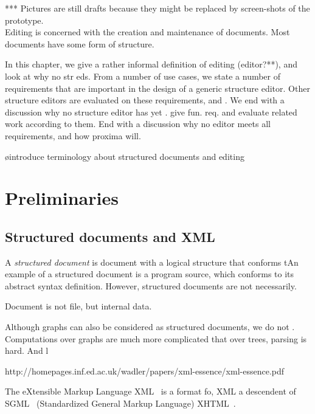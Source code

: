 *** Pictures are still drafts because they might be replaced by screen-shots of the prototype.\\

\bc
Editing is concerned with the creation and maintenance of documents.  
Most documents have some form of structure. 

In this chapter, we give a rather informal definition of editing (editor?**), and look at why no str eds. From a number of use cases, we state a number of requirements that are important in the design of a generic structure editor. Other structure editors are evaluated on these requirements, and . We end with a discussion why no structure editor has yet .  give fun. req. and evaluate related work according to them. End with a discussion why no editor meets all requirements, and how proxima will.
\ec

%								
%								
%								

\bl
\o introduce terminology about structured documents and editing
\el



\section{Preliminaries}

\subsection{Structured documents and XML}



A {\em structured document} is document with a logical structure that conforms tAn example of a structured document is a program source, which conforms to its abstract syntax definition. However, structured documents are not necessarily. 

Document is not file, but internal data.


Although graphs can also be considered as structured documents, we do not . Computations over graphs are much more complicated that over trees, parsing is hard. And l
 

http://homepages.inf.ed.ac.uk/wadler/papers/xml-essence/xml-essence.pdf

The eXtensible Markup Language XML~\cite{xml11} is a format fo, XML a descendent of  SGML~\cite{sgml86} (Standardized General Markup Language) XHTML~\cite{xhtml}. 


